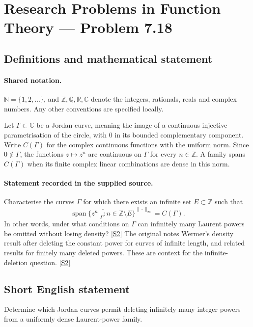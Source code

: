 \documentclass[11pt]{article}
\newcommand{\sref}[2]{\hyperlink{source:#1:#2}{[S#2]}}
\begin{document}
\section{Research Problems in Function Theory — Problem 7.18}\label{statement}

\subsection{Definitions and mathematical statement}

\paragraph{Shared notation.}$\mathbb N=\{1,2,\ldots\}$, and $\mathbb Z,\mathbb Q,\mathbb R,\mathbb C$ denote the integers, rationals, reals and complex numbers. Any other conventions are specified locally.


Let $\Gamma\subset\mathbb C$ be a Jordan curve, meaning the image of a continuous injective parametrisation of the circle, with $0$ in its bounded complementary component. Write $C(\Gamma)$ for the complex continuous functions with the uniform norm. Since $0\notin\Gamma$, the functions $z\mapsto z^n$ are continuous on $\Gamma$ for every $n\in\mathbb Z$. A family spans $C(\Gamma)$ when its finite complex linear combinations are dense in this norm.

\paragraph{Statement recorded in the supplied source.}
Characterise the curves $\Gamma$ for which there exists an infinite set $E\subset\mathbb Z$ such that
\[\overline{\operatorname{span}\{z^n|_\Gamma:n\in\mathbb Z\setminus E\}}^{\|\cdot\|_\infty}=C(\Gamma).\]
In other words, under what conditions on $\Gamma$ can infinitely many Laurent powers be omitted without losing density? \sref{statement}{2}
The original notes Wermer's density result after deleting the constant power for curves of infinite length, and related results for finitely many deleted powers. These are context for the infinite-deletion question. \sref{statement}{2}
\subsection{Short English statement}
Determine which Jordan curves permit deleting infinitely many integer powers from a uniformly dense Laurent-power family.
\end{document}

